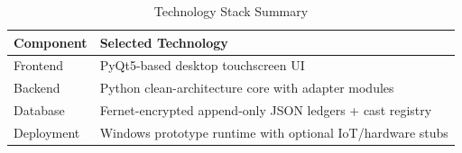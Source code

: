 \begin{table}[htbp]
\centering
\caption{Technology Stack Summary}
\begin{tabular}{p{}p{}}
\toprule
Component & Selected Technology \\
\midrule
Frontend & PyQt5-based desktop touchscreen UI \\
Backend & Python clean-architecture core with adapter modules \\
Database & Fernet-encrypted append-only JSON ledgers + cast registry \\
Deployment & Windows prototype runtime with optional IoT/hardware stubs \\
\bottomrule
\end{tabular}
\end{table}

\clearpage
